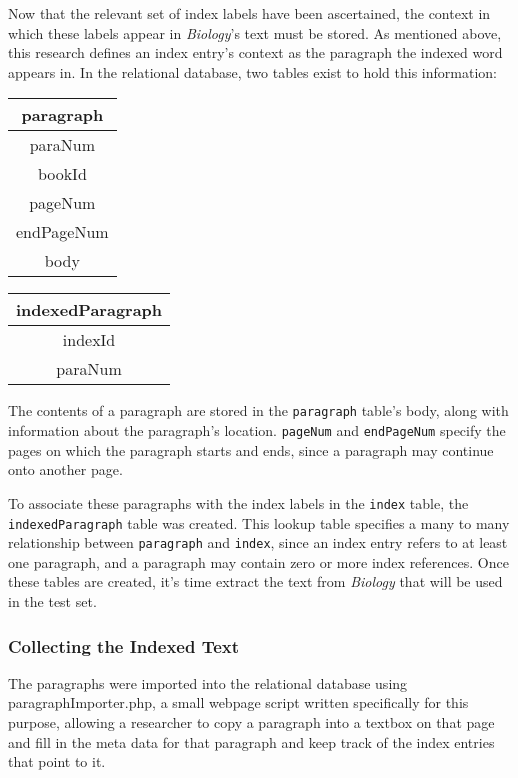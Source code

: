 Now that the relevant set of index labels have been ascertained, the context in which these labels appear in {\it Biology}'s text must be stored.
As mentioned above, this research defines an index entry's context as the paragraph the indexed word appears in.
In the relational database, two tables exist to hold this information:

\begin{center}
\begin{tabular}{|c|}
\hline 
\textbf{paragraph} \\ 
\hline 
paraNum \\ 
\hline 
bookId \\ 
\hline 
pageNum \\ 
\hline 
endPageNum \\ 
\hline 
body \\ 
\hline 
\end{tabular}
\end{center}

\begin{center}
\begin{tabular}{|c|}
\hline 
\textbf{indexedParagraph} \\ 
\hline 
indexId \\ 
\hline 
paraNum \\ 
\hline 
\end{tabular} 
\end{center}

The contents of a paragraph are stored in the {\tt paragraph} table's body, along with information about the paragraph's location.
{\tt pageNum} and {\tt endPageNum} specify the pages on which the paragraph starts and ends, since a paragraph may continue onto another page.

To associate these paragraphs with the index labels in the {\tt index} table, the {\tt indexedParagraph} table was created.
This lookup table specifies a many to many relationship between {\tt paragraph} and {\tt index}, since an index entry refers to at least one paragraph, and a paragraph may contain zero or more index references. Once these tables are created, it's time extract the text from {\it Biology} that will be used in the test set.

\subsubsection{Collecting the Indexed Text}

The paragraphs were imported into the relational database using paragraphImporter.php, a small webpage script written specifically for this purpose, allowing a researcher to copy a paragraph into a textbox on that page and fill in the meta data for that paragraph and keep track of the index entries that point to it.

